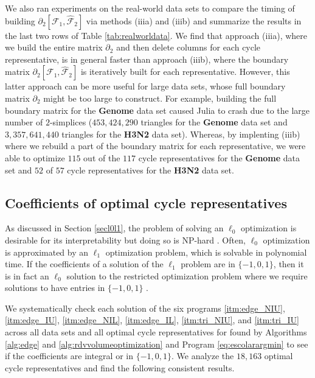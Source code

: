 \documentclass[utf8]{formatting_stuff/frontiersFPHY}
\newcommand{\tab}{Table }
\newcommand{\se}{Section }
\theoremstyle{plain}
\theoremstyle{definition}
\begin{document}
We also ran experiments on the real-world data sets to compare the timing of building $\partial_{2}[ \mathcal{F}_1 , \hat {\mathcal{F}}_{2}]$ via methods (iiia) and (iiib) and summarize the results in the last two rows of \tab \ref{tab:realworldata}. We find that approach (iiia), where we build the entire matrix $\partial_2$ and then delete columns for each cycle representative, is in general faster than approach (iiib), where the boundary matrix $\partial_2[\mathcal{F}_1, \hat{\mathcal{F}}_2]$ is iteratively built for each representative. However, this latter approach can be more useful for large data sets, whose full boundary matrix $\partial_2$ might be too large to construct. For example, building the full boundary matrix for the \textbf{Genome} data set caused Julia to crash due to the large number  of $2$-simplices ($453,424,290$ triangles for the \textbf{Genome} data set and $3,357,641,440$ triangles for the \textbf{H3N2} data set). Whereas, by implenting (iiib) where we rebuild a part of the boundary matrix for each representative, we were able to optimize $115$ out of the $117$ cycle representatives for the \textbf{Genome} data set and $52$ of $57$ cycle representatives for the \textbf{H3N2} data set.

\subsection{Coefficients of optimal cycle representatives}
\label{coefficient}
As discussed in \se \ref{secl0l1}, the problem of solving an $\ell_0$ optimization is desirable for its interpretability but doing so is NP-hard \cite{NPhardL0}. Often, $\ell_0$ optimization is approximated by an $\ell_1$ optimization problem, which is solvable in polynomial time. If the coefficients of a solution of the $\ell_1$ problem are in $\{-1,0,1\}$, then it is in fact an $\ell_0$ solution to the restricted optimization problem where we require solutions to have entries in $\{-1, 0, 1\}$ \cite{Escolar2016, Obayashi2018}. 

We systematically check each solution of the six programs
\ref{itm:edge_NIU},
\ref{itm:edge_IU},
\ref{itm:edge_NIL},
\ref{itm:edge_IL},
\ref{itm:tri_NIU}, and
\ref{itm:tri_IU}
 across all data sets and all optimal cycle representatives for found by Algorithms \ref{alg:edge} and \ref{alg:rdvvolumeoptimization} and Program \eqref{eq:escolarargmin} to see if the coefficients are integral or in $\{-1,0,1\}$. We analyze the $18,163$ optimal cycle representatives and find the following consistent results.
 
\end{document}

